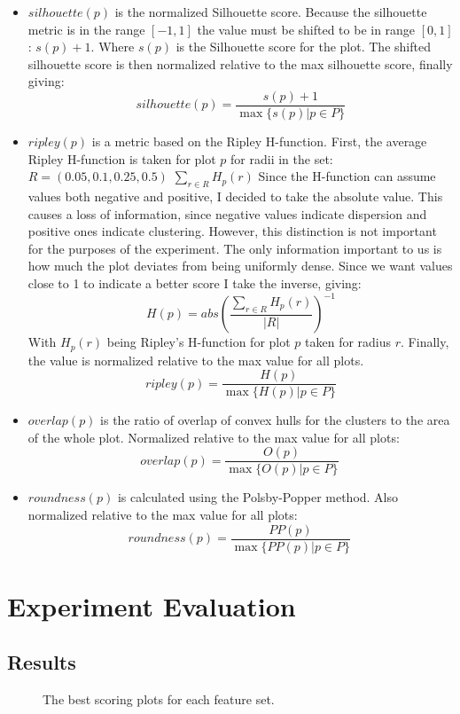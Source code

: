 \documentclass[11pt]{article}
\begin{document}
\begin{itemize}
\item \(silhouette(p)\) is the normalized Silhouette score. Because the silhouette metric is in the range \([-1, 1]\) the value must be shifted to be in range \([0, 1]\): \(s(p) + 1\). Where \(s(p)\) is the Silhouette score for the plot. The shifted silhouette score is then normalized relative to the max silhouette score, finally giving:
\[silhouette(p) = \frac{s(p) + 1}{\max\{s(p) | p \in P\}}\]
\item \(ripley(p)\) is a metric based on the Ripley H-function. First, the average Ripley H-function is taken for plot \(p\) for radii in the set: \(R = (0.05, 0.1, 0.25, 0.5)\) \(\sum_{r \in R} H_{p}(r)\) Since the H-function can assume values both negative and positive, I decided to take the absolute value. This causes a loss of information, since negative values indicate dispersion and positive ones indicate clustering. However, this distinction is not important for the purposes of the experiment. The only information important to us is how much the plot deviates from being uniformly dense. Since we want values close to 1 to indicate a better score I take the inverse, giving:
\[H(p) = abs(\frac{\sum_{r \in R} H_{p}(r)}{|R|})^{-1}\]
With \(H_{p}(r)\) being Ripley's H-function for plot \(p\) taken for radius \(r\). Finally, the value is normalized relative to the max value for all plots.
\[ ripley(p) = \frac{H(p)}{ \max \{ H(p)| p \in P \}} \]
\item \(overlap(p)\) is the ratio of overlap of convex hulls for the clusters to the area of the whole plot. Normalized relative to the max value for all plots:
\[ overlap(p) = \frac{O(p)}{ \max \{ O(p)| p \in P \}} \  \]
\item \(roundness(p)\) is calculated using the Polsby-Popper method. Also normalized relative to the max value for all plots:
\[ roundness(p) = \frac{PP(p)}{ \max \{ PP(p)| p \in P \}} \  \]
\end{itemize}

\section{Experiment Evaluation}
\label{sec:org8d9a4f0}
\subsection{Results}
\label{sec:org5ce221c}

\begin{figure}[htbp]
\centering
{}
\caption{\label{fig:best_overall}The best scoring plots for each feature set.}
\end{figure}
\end{document}
